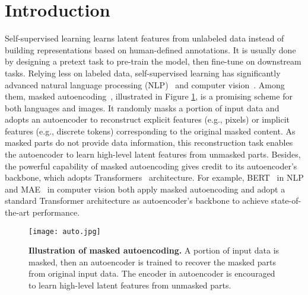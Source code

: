 \documentclass[runningheads]{llncs}
\begin{document}
\section{Introduction}



Self-supervised learning learns latent features from unlabeled data instead of building representations based on human-defined annotations. It is usually done by designing a pretext task to pre-train the model, then fine-tune on downstream tasks. Relying less on labeled data, self-supervised learning has significantly advanced natural language processing (NLP)~\cite{bert,nlp1,nlp3,nlp2} and computer vision~\cite{cv1,cv2,cvcontrastive1,cvcontrastive2,cvgenerative1,data2vec,mae,simmim}. Among them, masked autoencoding~\cite{mae,simmim,data2vec}, illustrated in Figure \ref{fig:auto}, is a promising scheme for both languages and images. It randomly masks a portion of input data and adopts an autoencoder to reconstruct explicit features (e.g., pixels) or implicit features (e.g., discrete tokens) corresponding to the original masked content. As masked parts do not provide data information, this reconstruction task enables the autoencoder to learn high-level latent features from unmasked parts. Besides, the powerful capability of masked autoencoding gives credit to its autoencoder's backbone, which adopts Transformers~\cite{tf} architecture. For example, BERT~\cite{bert} in NLP and MAE~\cite{mae} in computer vision both apply masked autoencoding and adopt a standard Transformer architecture as autoencoder's backbone to achieve state-of-the-art performance.

\begin{figure}
    \centering
    \texttt{[image: auto.jpg]}
    \caption{{\bf Illustration of masked autoencoding.} A portion of input data is masked, then an autoencoder is trained to recover the masked parts from original input data. The encoder in autoencoder is encouraged to learn high-level latent features from unmasked parts.}
    \label{fig:auto}
\end{figure}
\end{document}
